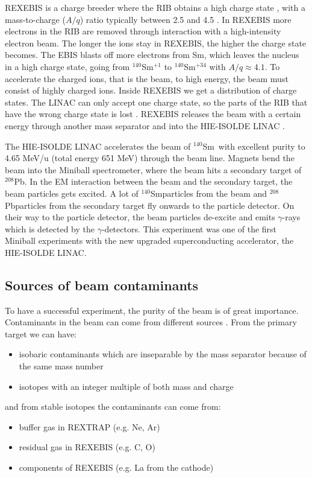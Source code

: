 \documentclass[twoside,english]{uiofysmaster/uiofysmaster}
\newcommand{\Sm}{$^{140}$Sm} %
\newcommand{\Pb}{$^{208}$Pb}
\newcommand{\ga}{$\gamma$}
\begin{document}
REXEBIS is a charge breeder where the RIB obtains a high charge state \cite{REXEBIS}, with a mass-to-charge ($A/q$) ratio typically between 2.5 and 4.5 \cite{Post-acc}.
In REXEBIS more electrons in the RIB are removed through interaction with a high-intensity electron beam. 
The longer the ions stay in REXEBIS, the higher the charge state becomes. 
The EBIS blasts off more electrons from Sm, which leaves the nucleus in a high charge state, going from \Sm$^{+1}$ to \Sm$^{+34}$ with $A/q \approx 4.1$. 
To accelerate the charged ions, that is the beam, to high energy, the beam must consist of highly charged ions. 
Inside REXEBIS we get a distribution of charge states.
The LINAC can only accept one charge state, so the parts of the RIB that have the wrong charge state is lost \cite{REX-web, HIE-web, EBIS2002, EBIS2010}.
REXEBIS releases the beam with a certain energy through another mass separator and into the HIE-ISOLDE LINAC \cite{HIE-ISOLDE}. 

The HIE-ISOLDE LINAC accelerates the beam of \Sm\ with excellent purity to 4.65 MeV/u (total energy 651 MeV) through the beam line. 
Magnets bend the beam into the Miniball spectrometer, where the beam hits a secondary target of \Pb. 
In the EM interaction between the beam and the secondary target, the beam particles gets excited. 
A lot of \Sm particles from the beam and \Pb particles from the secondary target fly onwards to the particle detector. 
On their way to the particle detector, the beam particles de-excite and emits \ga-rays which is detected by the \ga-detectors. 
This experiment was one of the first Miniball experiments with the new upgraded superconducting accelerator, the HIE-ISOLDE LINAC. 


\subsection{Sources of beam contaminants}
To have a successful experiment, the purity of the beam is of great importance. Contaminants in the beam can come from different sources  \cite{MB-spect}. From the primary target we can have:
\begin{itemize}
	\item isobaric contaminants which are inseparable by the mass separator because of the same mass number
	\item isotopes with an integer multiple of both mass and charge
\end{itemize}
and from stable isotopes the contaminants can come from:
\begin{itemize}
	\item buffer gas in REXTRAP (e.g. Ne, Ar)
	\item residual gas in REXEBIS (e.g. C, O)
	\item components of REXEBIS (e.g. La from the cathode)
\end{itemize}
\end{document}
